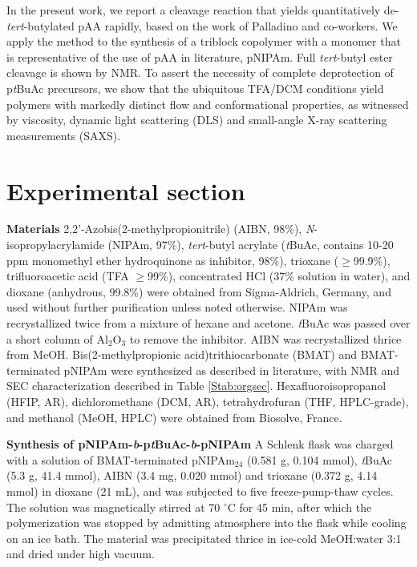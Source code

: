 \documentclass{article}
\begin{document}
In the present work, we report a cleavage reaction that yields quantitatively de-\emph{
tert}-butylated pAA rapidly, based on the work of 
Palladino and co-workers.\cite{Palladino2012} We apply the method to the synthesis of a 
triblock copolymer with a monomer that is representative \cite{Lue2011, Schilli2004a}
of the use of pAA in literature, pNIPAm. Full 
\emph{tert}-butyl ester cleavage is shown
by NMR. To assert the necessity of complete deprotection of p\emph{t}BuAc precursors, we show that the ubiquitous 
TFA/DCM conditions yield polymers with markedly distinct flow and conformational properties, as witnessed by viscosity,
dynamic light scattering (DLS) and small-angle X-ray scattering measurements (SAXS).

\section*{Experimental section}
\textbf{Materials}
2,2'-Azobis(2-methylpropionitrile) (AIBN, 98\%), \emph{N}-iso\-propyl\-acryl\-amide (NIPAm,  97\%), \emph{tert}-butyl acrylate (\emph{t}BuAc, 
contains 10-20 ppm mono\-methyl ether hydro\-quinone as inhibitor, 98\%), trioxane ($\geqslant$99.9\%), tri\-fluoro\-acetic acid (TFA $\geqslant$99\%), 
concentrated HCl (37\% solution in water), and dioxane (anhydrous, 99.8\%) were obtained from Sigma-Aldrich, Germany, and used without further purification 
unless noted otherwise. NIPAm was recrystallized twice from a mixture of hexane and acetone. \emph{t}BuAc was passed over a short column of Al$_2$O$_3$ to
remove the inhibitor. AIBN was recrystallized thrice from MeOH. Bis(2-methylpropionic acid)trithiocarbonate \cite{Lai2002a, Cetintas2017} (BMAT) and
BMAT-terminated pNIPAm \cite{Cetintas2017} were synthesized as described in literature, with NMR and SEC characterization described in Table \ref{Stab:orgsec}.
Hexafluoroisopropanol (HFIP, AR), dichloro\-methane (DCM, AR), tetra\-hydro\-furan (THF, HPLC-grade), and meth\-anol (MeOH, HPLC) were 
obtained from Biosolve, France.

\textbf{Synthesis of pNIPAm-\emph{b}-p\emph{t}BuAc-\emph{b}-pNIPAm}
A Schlenk flask was charged with a solution of BMAT-terminated pNIPAm$_\mathrm{24}$ (0.581 g, 0.104 mmol), \emph{t}BuAc (5.3 g, 41.4 mmol), 
AIBN (3.4 mg, 0.020 mmol) and trioxane (0.372 g, 4.14 mmol) in dioxane (21 mL), and was subjected
to five freeze-pump-thaw cycles. The solution was magnetically stirred at 70 $^\circ \mathrm{C}$ for 45 min, 
after which the polymerization was stopped by admitting atmosphere into the flask while cooling on an ice bath.
The material was precipitated thrice in ice-cold MeOH:water 3:1 and dried under high vacuum.
\end{document}
